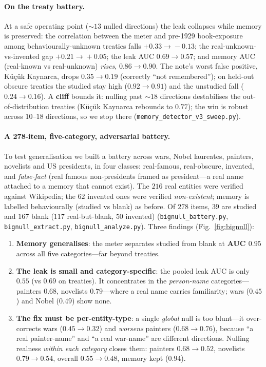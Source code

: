 \documentclass[11pt]{article}
\newcommand{\code}[1]{\texttt{\small #1}}
\begin{document}
\paragraph{On the treaty battery.} At a safe operating point ($\sim\!13$ nulled directions) the leak collapses while
memory is preserved: the correlation between the meter and pre-1929 book-exposure among behaviourally-unknown treaties
falls $+0.33\!\to\!-0.13$; the real-unknown-vs-invented gap $+0.21\!\to\!+0.05$; the leak AUC $0.69\!\to\!0.57$; and
memory AUC (real-known vs real-unknown) \emph{rises}, $0.86\!\to\!0.90$. The note's worst false positive,
K\"u\c{c}\"uk Kaynarca, drops $0.35\!\to\!0.19$ (correctly ``not remembered''); on held-out obscure treaties the studied
stay high ($0.92\!\to\!0.91$) and the unstudied fall ($0.24\!\to\!0.16$). A \textbf{cliff} bounds it: nulling past
$\sim\!18$ directions destabilises the out-of-distribution treaties (K\"u\c{c}\"uk Kaynarca rebounds to $0.77$); the win
is robust across $10$--$18$ directions, so we stop there (\code{memory\_detector\_v3\_sweep.py}).

\paragraph{A 278-item, five-category, adversarial battery.} To test generalisation we built a battery across wars,
Nobel laureates, painters, novelists and US presidents, in four classes: real-famous, real-obscure, invented, and
\emph{false-fact} (real famous non-presidents framed as president---a real name attached to a memory that cannot exist).
The $216$ real entities were verified against Wikipedia; the $62$ invented ones were verified \emph{non-existent};
memory is labelled behaviourally (studied vs blank) as before. Of $278$ items, $39$ are studied and $167$ blank
($117$ real-but-blank, $50$ invented) (\code{bignull\_battery.py}, \code{bignull\_extract.py}, \code{bignull\_analyze.py}).
Three findings (Fig.~\ref{fig:bignull}):
\begin{enumerate}\itemsep1pt
\item \textbf{Memory generalises}: the meter separates studied from blank at \textbf{AUC $0.95$} across all five
categories---far beyond treaties.
\item \textbf{The leak is small and category-specific}: the pooled leak AUC is only $0.55$ (vs $0.69$ on treaties). It
concentrates in the \emph{person-name} categories---painters $0.68$, novelists $0.79$---where a real name carries
familiarity; wars ($0.45$) and Nobel ($0.49$) show none.
\item \textbf{The fix must be per-entity-type}: a single \emph{global} null is too blunt---it over-corrects wars
($0.45\!\to\!0.32$) and \emph{worsens} painters ($0.68\!\to\!0.76$), because ``a real painter-name'' and ``a real
war-name'' are different directions. Nulling realness \emph{within each category} closes them: painters
$0.68\!\to\!0.52$, novelists $0.79\!\to\!0.54$, overall $0.55\!\to\!0.48$, memory kept ($0.94$).
\end{enumerate}
\end{document}
